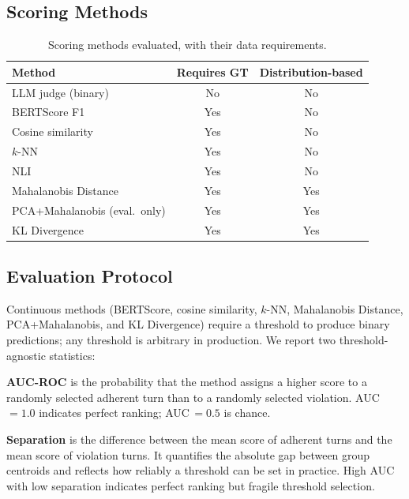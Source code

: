 \documentclass[11pt,a4paper]{article}
\begin{document}
\subsection{Scoring Methods}

\begin{table}[h]
  \centering
  \caption{Scoring methods evaluated, with their data requirements.}
  \label{tab:methods}
  \begin{tabular}{lcc}
    \toprule
    \textbf{Method} & \textbf{Requires GT} & \textbf{Distribution-based} \\
    \midrule
    LLM judge (binary)         & No  & No  \\
    BERTScore F1               & Yes & No  \\
    Cosine similarity          & Yes & No  \\
    $k$-NN                     & Yes & No  \\
    NLI                        & Yes & No  \\
    Mahalanobis Distance       & Yes & Yes \\
    PCA+Mahalanobis (eval.\ only) & Yes & Yes \\
    KL Divergence              & Yes & Yes \\
    \bottomrule
  \end{tabular}
\end{table}

\subsection{Evaluation Protocol}

Continuous methods (BERTScore, cosine similarity, $k$-NN, Mahalanobis Distance,
PCA+Mahalanobis, and KL Divergence) require a threshold to produce binary
predictions; any threshold is arbitrary in production. We report two
threshold-agnostic statistics:

\textbf{AUC-ROC} \citep{hanley1982auc} is the probability that the method
assigns a higher score to a randomly selected adherent turn than to a
randomly selected violation.
AUC\,$= 1.0$ indicates perfect ranking; AUC\,$= 0.5$ is chance.

\textbf{Separation} is the difference between the mean score of adherent turns
and the mean score of violation turns. It quantifies the absolute gap between
group centroids and reflects how reliably a threshold can be set in practice.
High AUC with low separation indicates perfect ranking but fragile threshold
selection.
\end{document}
